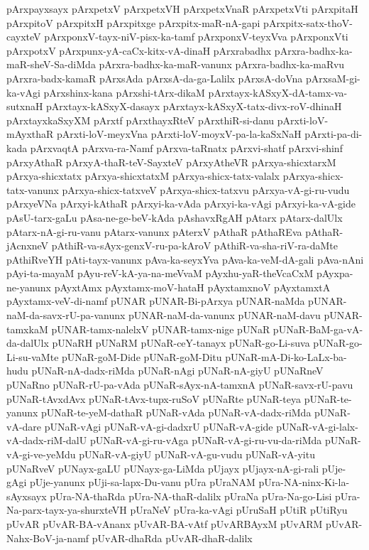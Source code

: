 {pArxpayxsayx
pArxpetxV
pArxpetxVH
pArxpetxVnaR
pArxpetxVti
pArxpitaH
pArxpitoV
pArxpitxH
pArxpitxge
pArxpitx-maR-nA-gapi
pArxpitx-satx-thoV-cayxteV
pArxponxV-tayx-niV-pisx-ka-tamf
pArxponxV-teyxVva
pArxponxVti
pArxpotxV
pArxpunx-yA-caCx-kitx-vA-dinaH
pArxrabadhx
pArxra-badhx-ka-maR-sheV-Sa-diMda
pArxra-badhx-ka-maR-vanunx
pArxra-badhx-ka-maRvu
pArxra-badx-kamaR
pArxsAda
pArxsA-da-ga-Lalilx
pArxsA-doVna
pArxsaM-gi-ka-vAgi
pArxshinx-kana
pArxshi-tArx-dikaM
pArxtayx-kASxyX-dA-tamx-va-sutxnaH
pArxtayx-kASxyX-dasayx
pArxtayx-kASxyX-tatx-divx-roV-dhinaH
pArxtayxkaSxyXM
pArxtf
pArxthayxRteV
pArxthiR-si-danu
pArxti-loV-mAyxthaR
pArxti-loV-meyxVna
pArxti-loV-moyxV-pa-la-kaSxNaH
pArxti-pa-di-kada
pArxvaqtA
pArxva-ra-Namf
pArxva-taRnatx
pArxvi-shatf
pArxvi-shinf
pArxyAthaR
pArxyA-thaR-teV-SayxteV
pArxyAtheVR
pArxya-shicxtarxM
pArxya-shicxtatx
pArxya-shicxtatxM
pArxya-shicx-tatx-valalx
pArxya-shicx-tatx-vanunx
pArxya-shicx-tatxveV
pArxya-shicx-tatxvu
pArxya-vA-gi-ru-vudu
pArxyeVNa
pArxyi-kAthaR
pArxyi-ka-vAda
pArxyi-ka-vAgi
pArxyi-ka-vA-gide
pAsU-tarx-gaLu
pAsa-ne-ge-beV-kAda
pAshavxRgAH
pAtarx
pAtarx-dalUlx
pAtarx-nA-gi-ru-vanu
pAtarx-vanunx
pAterxV
pAthaR
pAthaREva
pAthaR-jAcnxneV
pAthiR-va-sAyx-genxV-ru-pa-kAroV
pAthiR-va-sha-riV-ra-daMte
pAthiRveYH
pAti-tayx-vanunx
pAva-ka-seyxYva
pAva-ka-veM-dA-gali
pAva-nAni
pAyi-ta-mayaM
pAyu-reV-kA-ya-na-meVvaM
pAyxhu-yaR-theVcaCxM
pAyxpa-ne-yanunx
pAyxtAmx
pAyxtamx-moV-hataH
pAyxtamxnoV
pAyxtamxtA
pAyxtamx-veV-di-namf
pUNAR
pUNAR-Bi-pArxya
pUNAR-naMda
pUNAR-naM-da-savx-rU-pa-vanunx
pUNAR-naM-da-vanunx
pUNAR-naM-davu
pUNAR-tamxkaM
pUNAR-tamx-nalelxV
pUNAR-tamx-nige
pUNaR
pUNaR-BaM-ga-vA-da-dalUlx
pUNaRH
pUNaRM
pUNaR-ceY-tanayx
pUNaR-go-Li-suva
pUNaR-go-Li-su-vaMte
pUNaR-goM-Dide
pUNaR-goM-Ditu
pUNaR-mA-Di-ko-LaLx-ba-hudu
pUNaR-nA-dadx-riMda
pUNaR-nAgi
pUNaR-nA-giyU
pUNaRneV
pUNaRno
pUNaR-rU-pa-vAda
pUNaR-sAyx-nA-tamxnA
pUNaR-savx-rU-pavu
pUNaR-tAvxdAvx
pUNaR-tAvx-tupx-ruSoV
pUNaRte
pUNaR-teya
pUNaR-te-yanunx
pUNaR-te-yeM-dathaR
pUNaR-vAda
pUNaR-vA-dadx-riMda
pUNaR-vA-dare
pUNaR-vAgi
pUNaR-vA-gi-dadxrU
pUNaR-vA-gide
pUNaR-vA-gi-lalx-vA-dadx-riM-dalU
pUNaR-vA-gi-ru-vAga
pUNaR-vA-gi-ru-vu-da-riMda
pUNaR-vA-gi-ve-yeMdu
pUNaR-vA-giyU
pUNaR-vA-gu-vudu
pUNaR-vA-yitu
pUNaRveV
pUNayx-gaLU
pUNayx-ga-LiMda
pUjayx
pUjayx-nA-gi-rali
pUje-gAgi
pUje-yanunx
pUji-sa-lapx-Du-vanu
pUra
pUraNAM
pUra-NA-ninx-Ki-la-sAyxsayx
pUra-NA-thaRda
pUra-NA-thaR-dalilx
pUraNa
pUra-Na-go-Lisi
pUra-Na-parx-tayx-ya-shurxteVH
pUraNeV
pUra-ka-vAgi
pUruSaH
pUtiR
pUtiRyu
pUvAR
pUvAR-BA-vAnanx
pUvAR-BA-vAtf
pUvARBAyxM
pUvARM
pUvAR-Nahx-BoV-ja-namf
pUvAR-dhaRda
pUvAR-dhaR-dalilx
}
